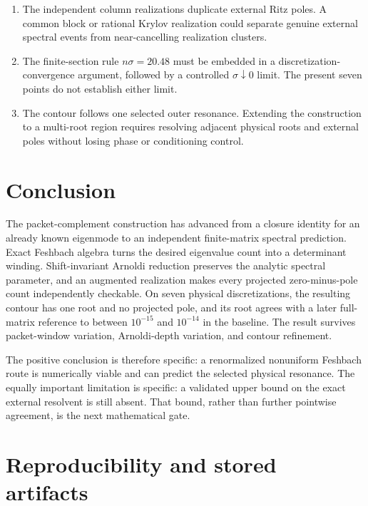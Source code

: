 \documentclass[11pt]{article}
\theoremstyle{definition}
\theoremstyle{remark}
\begin{document}
\begin{enumerate}
 \item The independent column realizations duplicate external Ritz poles.
 A common block or rational Krylov realization could separate genuine
 external spectral events from near-cancelling realization clusters.
 \item The finite-section rule $n\sigma=20.48$ must be embedded in a
 discretization-convergence argument, followed by a controlled
 $\sigma\downarrow0$ limit.  The present seven points do not establish either
 limit.
 \item The contour follows one selected outer resonance.  Extending the
 construction to a multi-root region requires resolving adjacent physical
 roots and external poles without losing phase or conditioning control.
\end{enumerate}

\section{Conclusion}
\label{sec:conclusion}

The packet-complement construction has advanced from a closure identity for
an already known eigenmode to an independent finite-matrix spectral
prediction.  Exact Feshbach algebra turns the desired eigenvalue count into
a determinant winding.  Shift-invariant Arnoldi reduction preserves the
analytic spectral parameter, and an augmented realization makes every
projected zero-minus-pole count independently checkable.  On seven physical
discretizations, the resulting contour has one root and no projected pole,
and its root agrees with a later full-matrix reference to between
$10^{-15}$ and $10^{-14}$ in the baseline.  The result survives packet-window
variation, Arnoldi-depth variation, and contour refinement.

The positive conclusion is therefore specific: a renormalized nonuniform
Feshbach route is numerically viable and can predict the selected physical
resonance.  The equally important limitation is specific: a validated upper
bound on the exact external resolvent is still absent.  That bound, rather
than further pointwise agreement, is the next mathematical gate.

\appendix

\section{Reproducibility and stored artifacts}
\label{app:reproducibility}
\end{document}

